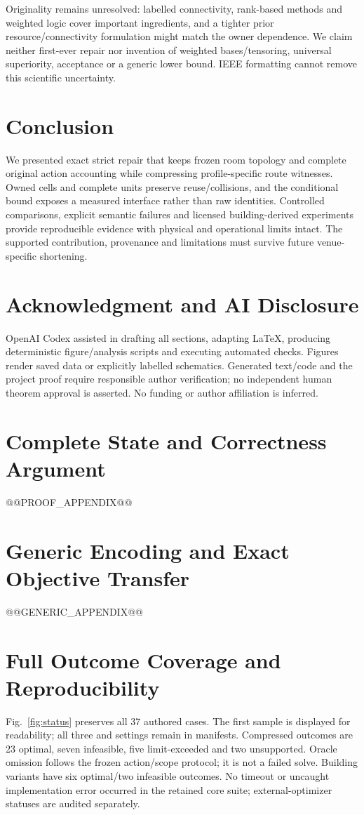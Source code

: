 \documentclass[conference]{IEEEtran}
\begin{document}
Originality remains unresolved: labelled connectivity, rank-based methods and weighted logic cover important ingredients, and a tighter prior resource/connectivity formulation might match the owner dependence. We claim neither first-ever repair nor invention of weighted bases/tensoring, universal superiority, acceptance or a generic lower bound. IEEE formatting cannot remove this scientific uncertainty.

\section{Conclusion}
We presented exact strict repair that keeps frozen room topology and complete original action accounting while compressing profile-specific route witnesses. Owned cells and complete units preserve reuse/collisions, and the conditional bound exposes a measured interface rather than raw identities. Controlled comparisons, explicit semantic failures and licensed building-derived experiments provide reproducible evidence with physical and operational limits intact. The supported contribution, provenance and limitations must survive future venue-specific shortening.

\section*{Acknowledgment and AI Disclosure}
OpenAI Codex assisted in drafting all sections, adapting LaTeX, producing deterministic figure/analysis scripts and executing automated checks. Figures render saved data or explicitly labelled schematics. Generated text/code and the project proof require responsible author verification; no independent human theorem approval is asserted. No funding or author affiliation is inferred.

\appendices
\section{Complete State and Correctness Argument}\label{app:proof}
@@PROOF_APPENDIX@@

\section{Generic Encoding and Exact Objective Transfer}\label{app:generic}
@@GENERIC_APPENDIX@@

\section{Full Outcome Coverage and Reproducibility}\label{app:coverage}
Fig.~\ref{fig:status} preserves all 37 authored cases. The first sample is displayed for readability; all three and settings remain in manifests. Compressed outcomes are 23 optimal, seven infeasible, five limit-exceeded and two unsupported. Oracle omission follows the frozen action/scope protocol; it is not a failed solve. Building variants have six optimal/two infeasible outcomes. No timeout or uncaught implementation error occurred in the retained core suite; external-optimizer statuses are audited separately.
\end{document}

